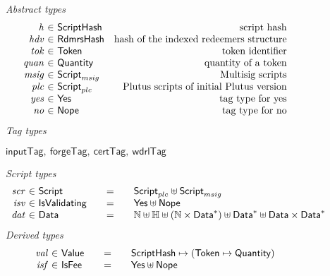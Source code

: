 \begin{figure*}[htb]
  \emph{Abstract types}
  \begin{equation*}
    \begin{array}{r@{~\in~}lr}
      \var{h} &\ScriptHash & \text{ script hash}\\
      \var{hdv} &\RdmrsHash & \text{hash of the indexed redeemers structure}\\
      \var{tok} & \Token & \text{token identifier}\\
      \var{quan} & \Quantity & \text{quantity of a token}\\
      \var{msig} & \ScriptMSig & \text{Multisig scripts} \\
      \var{plc} & \ScriptPlutus & \text{Plutus scripts of initial Plutus version} \\
      \var{yes} & \Yes & \text{tag type for yes} \\
      \var{no} & \Nope & \text{tag type for no} \\
    \end{array}
  \end{equation*}
  \emph{Tag types}
  \begin{center}
    $\mathsf{inputTag},~\mathsf{forgeTag},~\mathsf{certTag},~\mathsf{wdrlTag}$
  \end{center}
  \emph{Script types}
  \begin{equation*}
    \begin{array}{r@{~\in~}l@{\qquad=\qquad}lr}
      \var{scr} & \Script & \ScriptPlutus \uniondistinct \ScriptMSig \\
      \var{isv} & \IsValidating & \Yes \uniondistinct \Nope \\
      \var{dat}
      & \Data
      & \mathbb{N}\uniondistinct\mathbb{H}\uniondistinct(\mathbb{N}\times\seqof{\Data})
        \uniondistinct\seqof{\Data}\uniondistinct\seqof{\Data \times \Data}
    \end{array}
  \end{equation*}
%
  \emph{Derived types}
  \begin{equation*}
    \begin{array}{r@{~\in~}l@{\qquad=\qquad}lr}
      \var{val} & \Value
      & \ScriptHash \mapsto (\Token \mapsto \Quantity)
      \\
      \var{isf}
      & \IsFee
      & \Yes \uniondistinct \Nope

\end{array}
\end{equation*}
\end{figure*}
